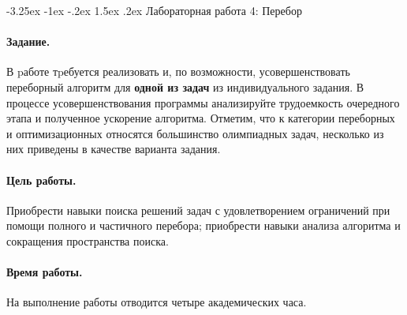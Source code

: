 \documentclass[12pt, openany, twoside]{book} %
\makeatletter
\renewcommand\section{\@startsection {section}{1}{\z@}%
                                   {-3.25ex \@plus -1ex \@minus -.2ex}%
                                   {1.5ex \@plus.2ex}%
                                   {\normalfont\large\bfseries}}
\makeatother
\begin{document}
\section{Лабораторная работа 4: Перебор}

\paragraph{Задание.} В pаботе тpебуется реализовать и, по возможности, усовершенствовать переборный алгоритм для {\bf одной из задач} из индивидуального задания. В процессе усовершенствования программы анализируйте трудоемкость очередного этапа и полученное ускорение алгоритма. Отметим, что к категории переборных и оптимизационных относятся большинство олимпиадных задач, несколько из них приведены в качестве варианта задания.

\paragraph{Цель работы.} Приобрести навыки поиска решений задач с удовлетворением ограничений при помощи полного и частичного перебора; приобрести навыки анализа алгоритма и сокращения пространства поиска.

\paragraph{Время работы.} На выполнение работы отводится четыре академических часа.
\end{document}
